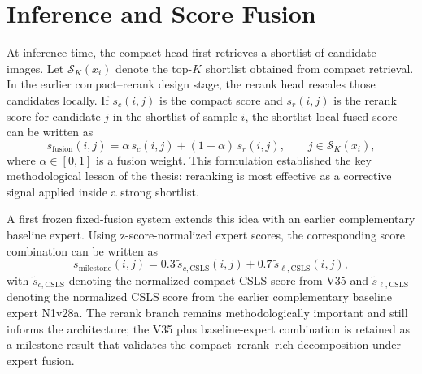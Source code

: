 \section{Inference and Score Fusion}

At inference time, the compact head first retrieves a shortlist of candidate images. Let $\mathcal{S}_K(x_i)$ denote the top-$K$ shortlist obtained from compact retrieval. In the earlier compact--rerank design stage, the rerank head rescales those candidates locally. If $s_c(i,j)$ is the compact score and $s_r(i,j)$ is the rerank score for candidate $j$ in the shortlist of sample $i$, the shortlist-local fused score can be written as
\begin{equation}
s_{\mathrm{fusion}}(i,j) = \alpha \, s_c(i,j) + (1-\alpha) \, s_r(i,j), \qquad j \in \mathcal{S}_K(x_i),
\label{eq:fusion_score}
\end{equation}
where $\alpha \in [0,1]$ is a fusion weight. This formulation established the key methodological lesson of the thesis: reranking is most effective as a corrective signal applied inside a strong shortlist.

A first frozen fixed-fusion system extends this idea with an earlier complementary baseline expert. Using z-score-normalized expert scores, the corresponding score combination can be written as
\begin{equation}
s_{\mathrm{milestone}}(i,j) = 0.3\,\widetilde{s}_{c,\mathrm{CSLS}}(i,j) + 0.7\,\widetilde{s}_{\ell,\mathrm{CSLS}}(i,j),
\label{eq:best_fusion_score}
\end{equation}
with $\widetilde{s}_{c,\mathrm{CSLS}}$ denoting the normalized compact-CSLS score from V35 and $\widetilde{s}_{\ell,\mathrm{CSLS}}$ denoting the normalized CSLS score from the earlier complementary baseline expert N1v28a. The rerank branch remains methodologically important and still informs the architecture; the V35 plus baseline-expert combination is retained as a milestone result that validates the compact--rerank--rich decomposition under expert fusion.

